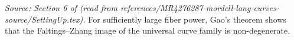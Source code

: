 \begin{theorem}
  \label{thm:nondeg_for_bd}
  \textit{Source: Section 6 of \cite{MR4276287-mordell-lang-curves} (read from references/MR4276287-mordell-lang-curves-source/SettingUp.tex).}
  For sufficiently large fiber power, Gao's theorem shows that the Faltings--Zhang
  image of the universal curve family is non-degenerate.
\end{theorem}

